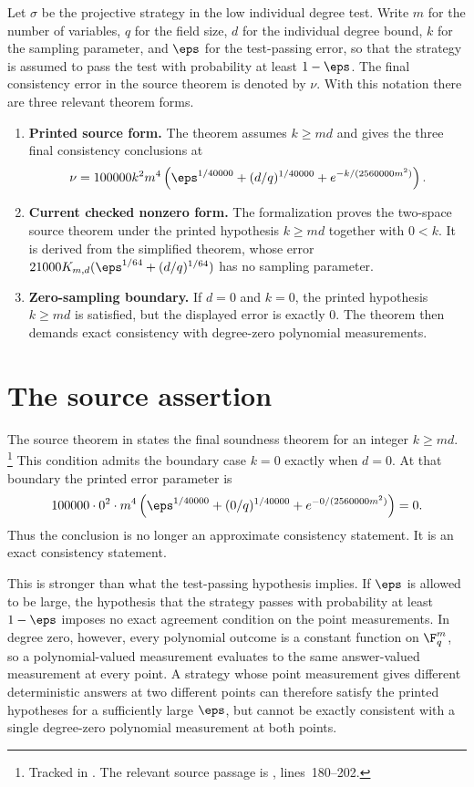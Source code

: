 \documentclass[11pt]{article}
\begin{document}
Let \(\sigma\) be the projective strategy in the low individual degree test.
Write \(m\) for the number of variables, \(q\) for the field size, \(d\) for
the individual degree bound, \(k\) for the sampling parameter, and \(\eps\) for
the test-passing error, so that the strategy is assumed to pass the test with
probability at least \(1-\eps\).  The final consistency error in the source
theorem is denoted by \(\nu\).  With this notation there are three relevant
theorem forms.
\begin{enumerate}
  \item \textbf{Printed source form.}  The theorem
   assumes \(k\ge md\) and gives the three final
  consistency conclusions at
  \[
    \nu =
    100000 k^2m^4\left(\eps^{1/40000}+(d/q)^{1/40000}
      + e^{-k/(2560000m^2)}\right).
  \]
  \item \textbf{Current checked nonzero form.}  The formalization proves the
  two-space source theorem under the printed hypothesis \(k\ge md\) together
  with \(0<k\).  It is derived from the simplified theorem, whose error
  \(21000K_{m,d}(\eps^{1/64}+(d/q)^{1/64})\) has no sampling parameter.
  \item \textbf{Zero-sampling boundary.}  If \(d=0\) and \(k=0\), the printed
  hypothesis \(k\ge md\) is satisfied, but the displayed error is exactly
  \(0\).  The theorem then demands exact consistency with degree-zero
  polynomial measurements.
\end{enumerate}

\section{The source assertion}

The source theorem in \cite{Ji2020LowIndividualDegree} states the final
soundness theorem for an integer \(k\ge md\).%
\footnote{Tracked in .  The relevant source passage is
, lines~180--202.}
This condition admits the boundary case \(k=0\) exactly when \(d=0\).  At that
boundary the printed error parameter is
\[
  100000\cdot 0^2\cdot m^4
  \left(\eps^{1/40000}+(0/q)^{1/40000}
    + e^{-0/(2560000m^2)}\right)=0.
\]
Thus the conclusion is no longer an approximate consistency statement.  It is
an exact consistency statement.

This is stronger than what the test-passing hypothesis implies.  If
\(\eps\) is allowed to be large, the hypothesis that the strategy passes with
probability at least \(1-\eps\) imposes no exact agreement condition on the
point measurements.  In degree zero, however, every polynomial outcome is a
constant function on \(\F_q^m\), so a polynomial-valued measurement evaluates to
the same answer-valued measurement at every point.  A strategy whose point
measurement gives different deterministic answers at two different points can
therefore satisfy the printed hypotheses for a sufficiently large \(\eps\), but
cannot be exactly consistent with a single degree-zero polynomial measurement
at both points.
\end{document}
